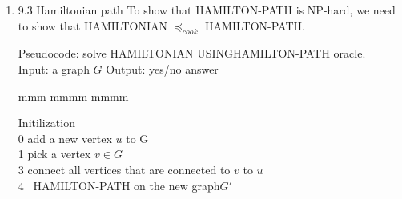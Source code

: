 \documentclass[11pt]{article}
\begin{document}
\begin{enumerate}
(b) Integer Knapsack problem\\
Input: list of values $[v_1,...,v_n]$, list of weights $[w_1,...w_n]$, weight limit $W$. \\
Optimization Objective:
Find a subset $ S \subseteq$ \{$1,...,n$\} to 
maximize the $V_max = \sum\limits_{k \in S} v_k \geq M$ under the constraint that 
$ \sum\limits_{k \in S} w_k \leq W$. \\

Output: $V_max$

(c)Prove that integer knapsack is np-hard by cook-reduction from KNAP.\\
Denote the integer knapsack optimization problem as KNAP-opt. We only need to show that KNAP $\preccurlyeq_cook$ KNAP-opt in order to show Knap-opt is np-hard because KNAP is np-complete from HW 9.1.

Algorithm to solve KNAP-opt calling KNAP:
We can apply binary search to find the $V_max$.\\ 
Refer the KNAP algorithm to HW9.1\\
First choose value $M$ to be $V_total$,the sum of value list $[v_1,...,v_n]$ run KNAP\\
If the answer is yes, increase $M$ by $(upbound-M)/2$ and run KNAP again. Also update $lowerbound = M$\\
If the answer is no, decrease $M$ by $(M-lowerbound)/2$ and update $upperbound = M$ and run KNAP again\\ 

The oracle needs to be called at most $log_2{V_{total}}$ times.

\item 9.3 Hamiltonian path
To show that HAMILTON-PATH is NP-hard, we need to show that HAMILTONIAN $\preccurlyeq_{cook}$ HAMILTON-PATH.

Pseudocode: solve HAMILTONIAN USINGHAMILTON-PATH oracle.\\
Input: a graph $G$
Output: yes/no answer

\begin{tabbing}
mmm \= mm\= mm \= mm\= mm\= \kill

Initilization\\
0 \> add a new vertex $u$ to G\\
1 \> pick a vertex $v \in G$\\
3 \> connect all vertices that are connected to $v$ to $u$\\
4 \> \breturn\ HAMILTON-PATH on the new graph$G'$\\


\end{tabbing}
\end{enumerate}
\end{document}
